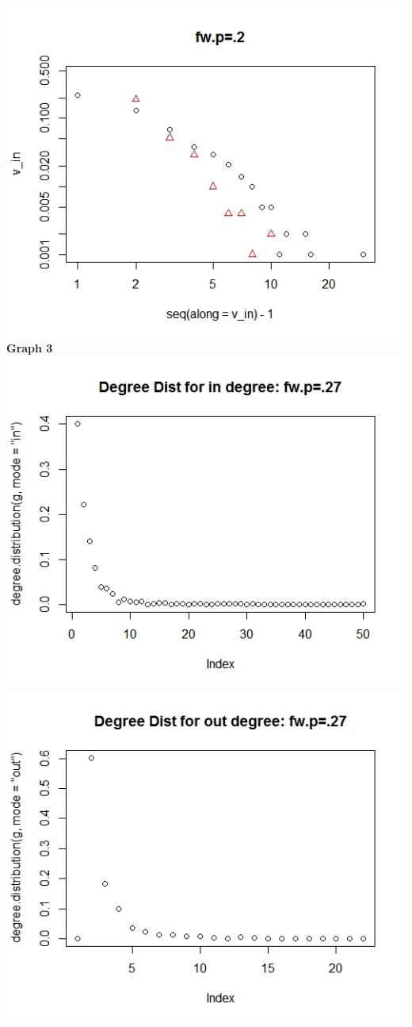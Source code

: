 \documentclass{article}
\begin{document}
\includegraphics[scale=0.4]{pd10} \\
\textbf{Graph 3}\\
\includegraphics[scale=0.4]{pd11} \\
\includegraphics[scale=0.4]{pd12} \\
\end{document}
